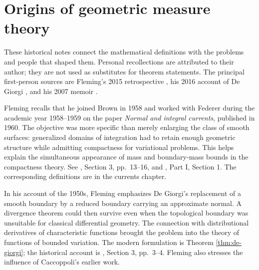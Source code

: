 \chapter{Origins of geometric measure theory}\label{sec:history-origins}
These historical notes connect the mathematical definitions with the problems and people that shaped them. Personal recollections are attributed to their author; they are not used as substitutes for theorem statements. The principal first-person sources are Fleming's 2015 retrospective \cite{Fle15}, his 2016 account of De Giorgi \cite{Fle16}, and his 2007 memoir \cite{Fle07}.

\begin{remark}\label{hist:integral-currents}
Fleming recalls that he joined Brown in 1958 and worked with Federer during the academic year 1958--1959 on the paper \emph{Normal and integral currents}, published in 1960. The objective was more specific than merely enlarging the class of smooth surfaces: generalized domains of integration had to retain enough geometric structure while admitting compactness for variational problems. This helps explain the simultaneous appearance of mass and boundary-mass bounds in the compactness theory. See \cite{Fle15}, Section 3, pp.~13--16, and \cite{Fle07}, Part I, Section 1. The corresponding definitions are in the currents chapter.
\end{remark}

\begin{remark}\label{hist:de-giorgi}
In his account of the 1950s, Fleming emphasizes De Giorgi's replacement of a smooth boundary by a reduced boundary carrying an approximate normal. A divergence theorem could then survive even when the topological boundary was unsuitable for classical differential geometry. The connection with distributional derivatives of characteristic functions brought the problem into the theory of functions of bounded variation. The modern formulation is Theorem \ref{thm:de-giorgi}; the historical account is \cite{Fle16}, Section 3, pp.~3--4. Fleming also stresses the influence of Caccoppoli's earlier work.
\end{remark}

